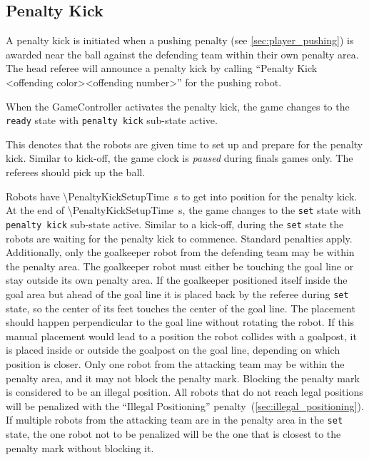 \subsection{Penalty Kick}
\label{sec:penalty_kick}

A penalty kick is initiated when a pushing penalty (see \cref{sec:player_pushing}) is awarded near the ball against the defending team within their own penalty area.
The head referee will announce a penalty kick by calling ``Penalty Kick \textless offending color\textgreater \textless offending number\textgreater'' for the pushing robot.

When the GameController activates the penalty kick, the game changes to the \texttt{ready} state with \texttt{penalty kick} sub-state active.

This denotes that the robots are given time to set up and prepare for the penalty kick.
Similar to kick-off, the game clock is \textit{paused} during finals games only.
The referees should pick up the ball.

Robots have \qty{\PenaltyKickSetupTime}{\second} to get into position for the penalty kick.
At the end of \qty{\PenaltyKickSetupTime}{\second}, the game changes to the \texttt{set} state with \texttt{penalty kick} sub-state active.
Similar to a kick-off, during the \texttt{set} state the robots are waiting for the penalty kick to commence.
Standard penalties apply.
Additionally, only the goalkeeper robot from the defending team may be within the penalty area.
The goalkeeper robot must either be touching the goal line or stay outside its own penalty area.
If the goalkeeper positioned itself inside the goal area but ahead of the goal line it is placed back by the referee during \texttt{set} state, so the center of its feet touches the center of the goal line.
The placement should happen perpendicular to the goal line without rotating the robot.
If this manual placement would lead to a position the robot collides with a goalpost, it is placed inside or outside the goalpost on the goal line, depending on which position is closer.
Only one robot from the attacking team may be within the penalty area, and it may not block the penalty mark.
Blocking the penalty mark is considered to be an illegal position.
All robots that do not reach legal positions will be penalized with the ``Illegal Positioning'' penalty~(\cf \cref{sec:illegal_positioning}).
If multiple robots from the attacking team are in the penalty area in the \texttt{set} state, the one robot not to be penalized will be the one that is closest to the penalty mark without blocking it.

